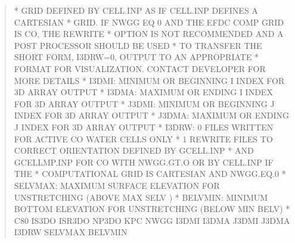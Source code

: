 \documentclass[letterpaper,10pt,english]{sphinxmanual}
\begin{document}
\begin{quote}
\begin{sphinxVerbatim}[commandchars=\\\{\}]
*            GRID DEFINED BY CELL.INP AS IF CELL.INP DEFINES A CARTESIAN
*            GRID.  IF NWGG EQ 0 AND THE EFDC COMP GRID IS CO, THE REWRITE
*            OPTION IS NOT RECOMMENDED AND A POST PROCESSOR SHOULD BE USED
*            TO TRANSFER THE SHORT FORM, I3DRW=0, OUTPUT TO AN APPROPRIATE
*            FORMAT FOR VISUALIZATION. CONTACT DEVELOPER FOR MORE DETAILS
*  I3DMI:    MINIMUM OR BEGINNING I INDEX FOR 3D ARRAY OUTPUT
*  I3DMA:    MAXIMUM OR ENDING I INDEX FOR 3D ARRAY OUTPUT
*  J3DMI:    MINIMUM OR BEGINNING J INDEX FOR 3D ARRAY OUTPUT
*  J3DMA:    MAXIMUM OR ENDING J INDEX FOR 3D ARRAY OUTPUT
*  I3DRW:  0 FILES WRITTEN FOR ACTIVE CO WATER CELLS ONLY
*          1 REWRITE FILES TO CORRECT ORIENTATION DEFINED BY GCELL.INP
*            AND GCELLMP.INP FOR CO WITH NWGG.GT.O OR BY CELL.INP IF THE
*            COMPUTATIONAL GRID IS CARTESIAN AND NWGG.EQ.0
*  SELVMAX:  MAXIMUM SURFACE ELEVATION FOR UNSTRETCHING (ABOVE MAX SELV )
*  BELVMIN:  MINIMUM BOTTOM ELEVATION FOR UNSTRETCHING (BELOW MIN BELV)
*
C80   IS3DO  ISR3DO   NP3DO     KPC    NWGG   I3DMI   I3DMA   J3DMI   J3DMA   I3DRW SELVMAX BELVMIN
\end{sphinxVerbatim}
\end{quote}
\end{document}
